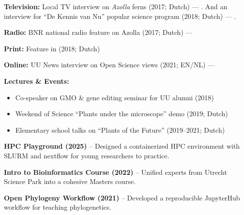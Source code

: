 \documentclass[a4paper,10pt]{article}
\begin{document}
\begin{description}
  \raggedright
  \item \textbf{Television:} Local TV interview on \textit{Azolla} ferns (2017; Dutch) — . 
  And an interview for “De Kennis van Nu” popular science program (2018; Dutch) — .
  \item \textbf{Radio:} BNR national radio feature on Azolla (2017; Dutch) — 
  \item \textbf{Print:} Feature in  (2018; Dutch)
  \item \textbf{Online:} UU News interview on Open Science views (2021; EN/NL) — 
  \item \textbf{Lectures \& Events:}
    \begin{itemize}
      \item Co‐speaker on GMO \& gene editing seminar for UU alumni (2018)
      \item Weekend of Science “Plants under the microscope” demo (2019; Dutch)
      \item Elementary school talks on “Plants of the Future” (2019–2021; Dutch)
    \end{itemize}
\end{description}


\begin{description}
  \item \textbf{HPC Playground (2025)} – Designed a containerized HPC environment with SLURM and nextflow for young researchers to practice.
  \item \textbf{Intro to Bioinformatics Course (2022)} – Unified experts from Utrecht Science Park into a cohesive Masters course.
  \item \textbf{Open Phylogeny Workflow (2021)} – Developed a reproducible JupyterHub workflow for teaching phylogenetics. 
\end{description}
\end{document}

